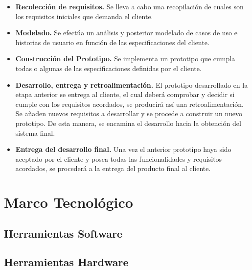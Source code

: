 
\begin{itemize}
	\item \textbf{Recolección de requisitos.} Se lleva a cabo una recopilación de cuales son los requisitos iniciales que demanda el cliente.
	\item \textbf{Modelado.} Se efectúa un análisis y posterior modelado de casos de uso e historias de usuario en función de las especificaciones del cliente.
	\item \textbf{Construcción del Prototipo.} Se implementa un prototipo que cumpla todas o algunas de las especificaciones definidas por el cliente.
	\item \textbf{Desarrollo, entrega y retroalimentación.} El prototipo desarrollado en la etapa anterior se entrega al cliente, el cual deberá comprobar y decidir si cumple con los requisitos acordados, se producirá así una retroalimentación. Se añaden nuevos requisitos a desarrollar y se procede a construir un nuevo prototipo. De esta manera, se encamina el desarrollo hacia la obtención del sistema final.
	\item \textbf{Entrega del desarrollo final.} Una vez el anterior prototipo haya sido aceptado por el cliente y posea todas las funcionalidades y requisitos acordados, se procederá a la entrega del producto final al cliente.
\end{itemize}

\section{Marco Tecnológico}
\label{sec:MarcoTecnologico}

\subsection{Herramientas Software}
\label{sec:HerramientasSoftware}

\subsection{Herramientas Hardware}
\label{sec:HerramientasHardware}